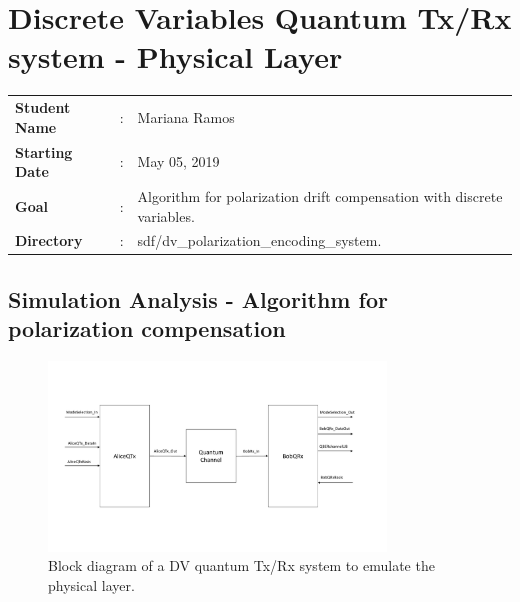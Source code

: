 \clearpage
\section{Discrete Variables Quantum Tx/Rx system - Physical Layer}

\begin{refsection}

\begin{tcolorbox}	
\begin{tabular}{p{2.75cm} p{0.2cm} p{10.5cm}} 	
\textbf{Student Name}  &:& Mariana Ramos\\
\textbf{Starting Date} &:& May 05, 2019\\
\textbf{Goal}          &:& Algorithm for polarization drift compensation with discrete variables.\\
\textbf{Directory}     &:& sdf/dv\_polarization\_encoding\_system.
\end{tabular}
\end{tcolorbox}



\subsection{Simulation Analysis - Algorithm for polarization compensation}

\begin{figure}[h]
    \centering
        \includegraphics[clip, trim=1.6cm 3.0cm 3cm 2cm, width=0.80\textwidth]{./sdf/DvQuantumTxRx/figures/Diagram.pdf}
    \caption{Block diagram of a DV quantum Tx/Rx system to emulate the physical layer.}\label{dvquantumtxrx_diagram}
\end{figure}


\end{refsection}
